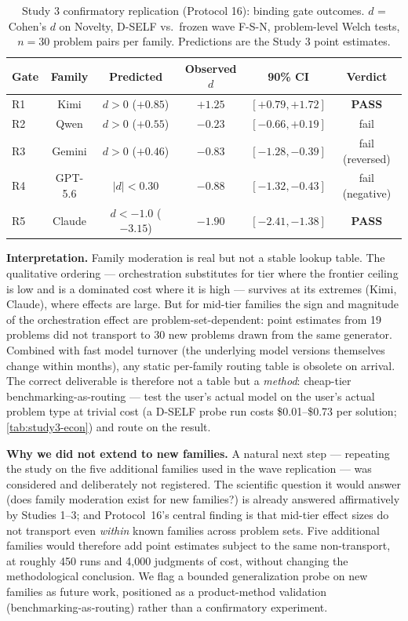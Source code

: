 \documentclass[12pt,a4paper]{article}
\begin{document}
\begin{table}[ht]
  \centering
  \caption{Study 3 confirmatory replication (Protocol 16): binding gate
  outcomes. $d$ = Cohen's $d$ on Novelty, D-SELF vs.\ frozen wave F-S-N,
  problem-level Welch tests, $n = 30$ problem pairs per family. Predictions
  are the Study 3 point estimates.}
  \label{tab:study3conf-gates}
  \begin{tabular}{@{}l c c c c c@{}}
    \toprule
    \textbf{Gate} & \textbf{Family} & \textbf{Predicted} & \textbf{Observed $d$}
      & \textbf{90\% CI} & \textbf{Verdict} \\
    \midrule
    R1 & Kimi     & $d > 0$ ($+0.85$)          & $+1.25$ & $[+0.79, +1.72]$  & \textbf{PASS} \\
    R2 & Qwen     & $d > 0$ ($+0.55$)          & $-0.23$ & $[-0.66, +0.19]$  & fail \\
    R3 & Gemini   & $d > 0$ ($+0.46$)          & $-0.83$ & $[-1.28, -0.39]$  & fail (reversed) \\
    R4 & GPT-5.6  & $|d| < 0.30$               & $-0.88$ & $[-1.32, -0.43]$  & fail (negative) \\
    R5 & Claude   & $d < -1.0$ ($-3.15$)       & $-1.90$ & $[-2.41, -1.38]$  & \textbf{PASS} \\
    \bottomrule
  \end{tabular}
\end{table}

\textbf{Interpretation.} Family moderation is real but not a stable lookup
table. The qualitative ordering --- orchestration substitutes for tier where
the frontier ceiling is low and is a dominated cost where it is high ---
survives at its extremes (Kimi, Claude), where effects are large. But for
mid-tier families the sign and magnitude of the orchestration effect are
problem-set-dependent: point estimates from 19 problems did not transport to
30 new problems drawn from the same generator. Combined with fast model
turnover (the underlying model versions themselves change within months),
any static per-family routing table is obsolete on arrival. The correct
deliverable is therefore not a table but a \emph{method}: cheap-tier
benchmarking-as-routing --- test the user's actual model on the user's actual
problem type at trivial cost (a D-SELF probe run costs \$0.01--\$0.73 per
solution; \cref{tab:study3-econ}) and route on the result.

\textbf{Why we did not extend to new families.} A natural next step ---
repeating the study on the five additional families used in the wave
replication --- was considered and deliberately not registered. The
scientific question it would answer (does family moderation exist for new
families?) is already answered affirmatively by Studies 1--3; and
Protocol~16's central finding is that mid-tier effect sizes do not transport
even \emph{within} known families across problem sets. Five additional
families would therefore add point estimates subject to the same
non-transport, at roughly 450 runs and 4{,}000 judgments of cost, without
changing the methodological conclusion. We flag a bounded generalization
probe on new families as future work, positioned as a product-method
validation (benchmarking-as-routing) rather than a confirmatory experiment.
\end{document}
